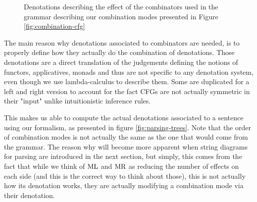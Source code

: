 \begin{figure}
	
	\caption{Denotations describing the effect of the combinators used in the
		grammar describing our combination modes presented in
		Figure \ref{fig:combination-cfg}}
	\label{fig:combinator-denotations}
\end{figure}

The main reason why denotations associated to combinators are needed, is to
properly define how they actually do the combination of denotations.
Those denotations are a direct translation of the judgements defining the
notions of functors, applicatives, monads and thus are not specific to any
denotation system, even though we use lambda-calculus to describe them.
Some are duplicated for a left and right version to account for the fact CFGs
are not actually symmetric in their "input" unlike intuitionistic inference
rules.

This makes us able to compute the actual denotations associated to a sentence
using our formalism, as presented in figure \ref{fig:parsing-trees}.
Note that the order of combination modes is not actually the same as the one
that would come from the grammar.
The reason why will become more apparent when string diagrams for parsing are
introduced in the next section, but simply, this comes from the fact that while
we think of $\text{ML}$ and $\text{MR}$ as reducing the number of effects on each
side (and this is the correct way to think about those), this is not actually
how its denotation works, they are actually modifying a combination mode via
their denotation.

